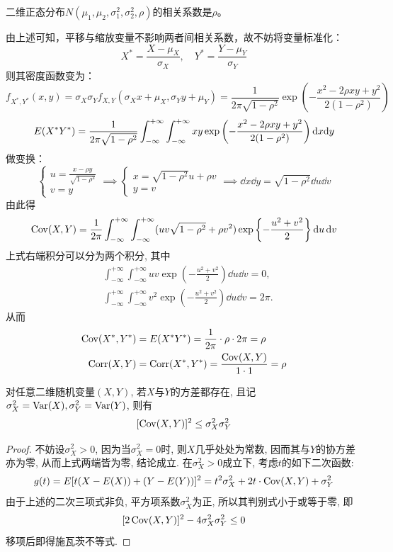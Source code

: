 \begin{example}\label{exam:3.4.9}
    二维正态分布$N(\mu_{1}, \mu_{2}, \sigma_{1}^{2}, \sigma_{2}^{2}, \rho)$的相关系数是$\rho$。
\end{example}
\begin{solution}
    由上述可知，平移与缩放变量不影响两者间相关系数，故不妨将变量标准化：
    \[ X^*=\frac{X-\mu_X}{\sigma_X},\quad Y^*=\frac{Y-\mu_Y}{\sigma_Y} \]
    则其密度函数变为：
    \[ f_{X^*,Y^*}(x,y) = \sigma_X \sigma_Y f_{X,Y}(\sigma_X x+\mu_X,\sigma_Y y+\mu_Y) = \frac{1}{2 \pi \sqrt{1-\rho^2}} \exp \left(- \frac{x^2 - 2 \rho x y +y^2}{2(1-\rho^2)} \right)\]
    \[ E(X^* Y^*) = \frac{1}{2 \pi \sqrt{1-\rho^2}} \int_{-\infty}^{+\infty}\int_{-\infty}^{+\infty}x y \exp \left(- \frac{x^2 - 2 \rho x y +y^2}{2(1-\rho^2)} \right) \mathrm{d} x \mathrm{d} y\]
    做变换：
    \[ \begin{cases}
            u = \frac{x- \rho y}{\sqrt{1-\rho^2}} \\
            v = y
        \end{cases} \implies \begin{cases}
            x = \sqrt{1-\rho^2}u + \rho v \\
            y =  v
        \end{cases} \implies \dd x\dd y= \sqrt{1-\rho^2}\dd u\dd v \]
    由此得
    \[ \operatorname{Cov}(X,Y)=\frac{1}{2\pi}\int_{-\infty}^{+\infty}\int_{-\infty}^{+\infty}(uv\sqrt{1-\rho^2}+\rho v^2)\exp\left\{ -\frac{u^2+v^2}{2} \right\}\mathop{}\!\mathrm d u\mathop{}\!\mathrm d v \]
    上式右端积分可以分为两个积分, 其中
    \begin{align*}
         & \int_{-\infty}^{+\infty}\int_{-\infty}^{+\infty} uv\exp\left(-\frac{u^2+v^2}{2} \right)\dd u\dd v=0,     \\
         & \int_{-\infty}^{+\infty}\int_{-\infty}^{+\infty} v^2\exp\left(-\frac{u^2+v^2}{2} \right)\dd u\dd v=2\pi.
    \end{align*}
    从而
    \begin{align*}
        \operatorname{Cov}(X^*,Y^*) & =E(X^* Y^*)=\frac{1}{2\pi}\cdot \rho\cdot 2\pi=\rho \\
        \operatorname{Corr}(X,Y)    & =\operatorname{Corr}(X^*,Y^*)=\frac{\operatorname{Cov}(X,Y)}{1 \cdot 1}=\rho
    \end{align*}
\end{solution}

\begin{lemma}[施瓦茨不等式]
    对任意二维随机变量$(X,Y)$, 若$X$与$Y$的方差都存在, 且记$\sigma_{X}^2=\operatorname{Var}(X),\sigma_{Y}^2=\operatorname{Var}(Y)$, 则有
    \[ [\operatorname{Cov}(X,Y)]^2\leq \sigma_{X}^2\sigma_{Y}^2 \]
\end{lemma}
\begin{proof}
    不妨设$\sigma_{X}^2>0$, 因为当$\sigma_{X}^2=0$时, 则$X$几乎处处为常数, 因而其与$Y$的协方差亦为零, 从而上式两端皆为零, 结论成立. 在$\sigma_{X}^2>0$成立下, 考虑$t$的如下二次函数:
    \[ g(t)=E[t(X-E(X))+(Y-E(Y))]^2=t^2 \sigma_{X}^2+2t\cdot \operatorname{Cov}(X,Y)+\sigma_{Y}^2 \]
    由于上述的二次三项式非负, 平方项系数$\sigma_{X}^2$为正, 所以其判别式小于或等于零, 即
    \[ [2\operatorname{Cov}(X,Y)]^2-4\sigma_{X}^2\sigma_{Y}^2\leq0 \]
    移项后即得施瓦茨不等式.
\end{proof}

